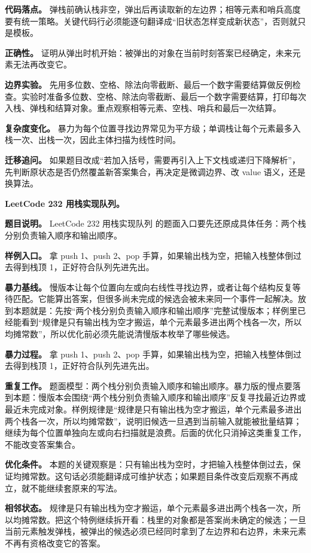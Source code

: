 \textbf{代码落点。} 弹栈前确认栈非空，弹出后再读取新的左边界；相等元素和哨兵高度要有统一策略。关键代码行必须能逐句翻译成“旧状态怎样变成新状态”，否则就只是模板。

\textbf{正确性。} 证明从弹出时机开始：被弹出的对象在当前时刻答案已经确定，未来元素无法再改变它。

\textbf{边界实验。} 先用多位数、空格、除法向零截断、最后一个数字需要结算做反例检查。实验时准备多位数、空格、除法向零截断、最后一个数字需要结算，打印每次入栈、弹栈和结算对象。重点观察相等元素、空栈、哨兵和最后一次结算。

\textbf{复杂度变化。} 暴力为每个位置寻找边界常见为平方级；单调栈让每个元素最多入栈一次、出栈一次，因此主体扫描为线性时间。

\textbf{迁移追问。} 如果题目改成“若加入括号，需要再引入上下文栈或递归下降解析”，先判断原状态是否仍然覆盖新答案集合，再决定是微调边界、改 value 语义，还是换算法。

\noindent\textbf{LeetCode 232 用栈实现队列。}

\textbf{题目说明。} LeetCode 232 用栈实现队列 的题面入口要先还原成具体任务：两个栈分别负责输入顺序和输出顺序。

\textbf{样例入口。} 拿 push 1、push 2、pop 手算，如果输出栈为空，把输入栈整体倒过去得到栈顶 1，正好符合队列先进先出。

\textbf{暴力基线。} 慢版本让每个位置向左或向右线性寻找边界，或者让每个结构反复等待匹配。它能算出答案，但很多尚未完成的候选会被未来同一个事件一起解决。放到本题就是：先按“两个栈分别负责输入顺序和输出顺序”完整试慢版本；样例里已经能看到“规律是只有输出栈为空才搬运，单个元素最多进出两个栈各一次，所以均摊常数”，所以优化前必须先能说清慢版本枚举了哪些候选。

\textbf{暴力过程。} 拿 push 1、push 2、pop 手算，如果输出栈为空，把输入栈整体倒过去得到栈顶 1，正好符合队列先进先出。

\textbf{重复工作。} 题面模型：两个栈分别负责输入顺序和输出顺序。暴力版的慢点要落到本题：慢版本会围绕“两个栈分别负责输入顺序和输出顺序”反复寻找最近边界或最近未完成对象。样例规律是“规律是只有输出栈为空才搬运，单个元素最多进出两个栈各一次，所以均摊常数”，说明旧候选一旦遇到当前输入就能被批量结算；继续为每个位置单独向左或向右扫描就是浪费。后面的优化只消掉这类重复工作，不能改变答案集合。

\textbf{优化条件。} 本题的关键观察是：只有输出栈为空时，才把输入栈整体倒过去，保证均摊常数。这句话必须能翻译成可维护状态；如果题目条件改变后观察不再成立，就不能继续套原来的写法。

\textbf{相邻状态。} 规律是只有输出栈为空才搬运，单个元素最多进出两个栈各一次，所以均摊常数。把这个特例继续拆开看：栈里的对象都是答案尚未确定的候选；一旦当前元素触发弹栈，被弹出的候选必须已经同时拿到了左边界和右边界，未来元素不再有资格改变它的答案。

